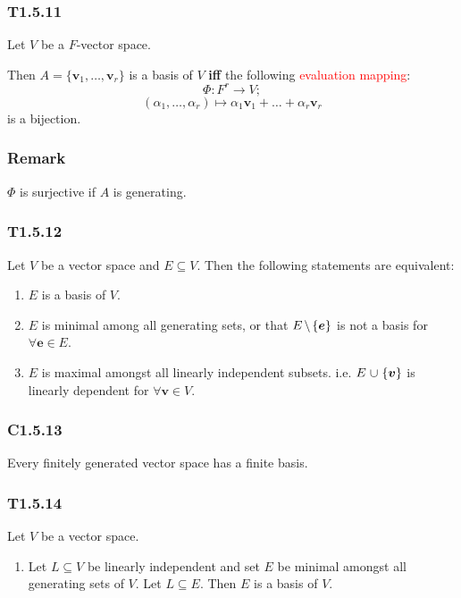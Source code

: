 \documentclass{article}
\newcommand{\vc}[1]{\boldsymbol{#1}}
\begin{document}
\begin{multicols*}{3}
\subsubsection*{T1.5.11}
Let $V$ be a $F$-vector space.

Then $A=\{\vc{v}_1,\dots,\vc{v}_r\}$ is a basis of $V$
\textbf{if{}f} the following \textcolor{red}{evaluation mapping}:
$$\Phi:F^r\rightarrow V;$$
$$(\alpha_1,\dots,\alpha_r)\mapsto
\alpha_1\vc{v}_1+\dots+\alpha_r\vc{v}_r$$
is a bijection.

\subsubsection*{Remark}
$\Phi$ is surjective if $A$ is generating.

\subsubsection*{T1.5.12}
Let $V$ be a vector space and $E\subseteq V$.
Then the following statements are equivalent:
\begin{enumerate}
    \item $E$ is a basis of $V$.
    
    \item $E$ is minimal among all generating sets,
    or that $E\hspace{0.02in}\backslash\hspace{0.02in}
    \{\vc{e}\}$ is not a basis for $\forall\vc{e}\in E$.

    \item $E$ is maximal amongst all linearly independent subsets.
    i.e. $E\hspace{0.01in}\cup\hspace{0.01in}\{\vc{v}\}$
    is linearly dependent for $\forall\vc{v}\in V$.
\end{enumerate}

\subsubsection*{C1.5.13}
Every finitely generated vector space has a finite basis.

\subsubsection*{T1.5.14}
Let $V$ be a vector space.
\begin{enumerate}
    \item Let $L\subseteq V$ be linearly independent and
    set $E$ be minimal amongst all generating sets of $V$.
    Let $L\subseteq E$.
    Then $E$ is a basis of $V$.


\end{enumerate}
\end{multicols*}
\end{document}

